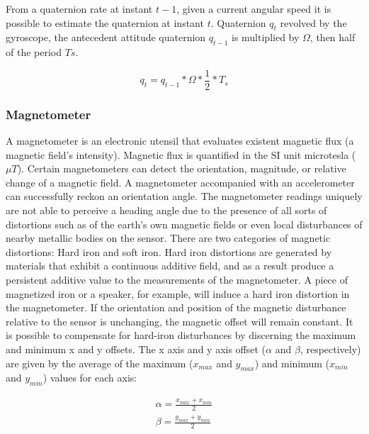 From a quaternion rate at instant $t-1$, given a current angular speed it is possible to estimate the quaternion at instant $t$. Quaternion $q_t$ revolved by the gyroscope, the antecedent attitude quaternion $q_{t−1}$ is multiplied by $\Omega$, then half of the period $Ts$.

\begin{equation}
    q_t = q_{t-1} \ast \Omega \ast \frac{1}{2} \ast T_s
\end{equation}

\subsubsection{Magnetometer}

A magnetometer is an electronic utensil that evaluates existent magnetic flux (a magnetic field's intensity). Magnetic flux is quantified in the SI unit microtesla ($\mu T$). Certain magnetometers can detect the orientation, magnitude, or relative change of a magnetic field. A magnetometer accompanied with an accelerometer can successfully reckon an orientation angle. The magnetometer readings uniquely are not able to perceive a heading angle due to the presence of all sorts of distortions such as of the earth's own magnetic fields or even local disturbances of nearby metallic bodies on the sensor. There are two categories of magnetic distortions: Hard iron and soft iron. Hard iron distortions are generated by materials that exhibit a continuous additive field, and as a result produce a persistent additive value to the measurements of the magnetometer. A piece of magnetized iron or a speaker, for example, will induce a hard iron distortion in the magnetometer. If the orientation and position of the magnetic disturbance relative to the sensor is unchanging, the magnetic offset will remain constant. It is possible to compensate for hard-iron disturbances by discerning the maximum and minimum x and y offsets. The x axis and y axis offset ($\alpha$ and $\beta$, respectively) are given by the average of the maximum ($x_{max}$ and $y_{max}$) and minimum ($x_{min}$ and $y_{min}$) values for each axis:

\begin{equation}
    \begin{gathered}
        \alpha = \frac{x_{max}+x_{min}}{2}\\
        \beta = \frac{y_{max}+y_{min}}{2}
    \end{gathered}
\end{equation}

